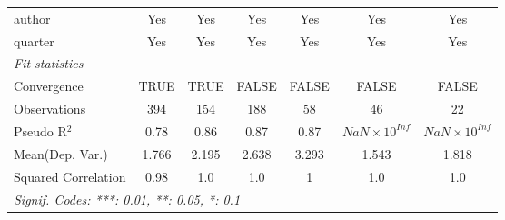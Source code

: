 \begin{tabular}{lcccccc}
   author                                                     & Yes         & Yes    & Yes          & Yes          & Yes                            & Yes\\  
   quarter                                                    & Yes         & Yes    & Yes          & Yes          & Yes                            & Yes\\  
   \midrule
   \emph{Fit statistics}\\
   Convergence                                                &TRUE         & TRUE   & FALSE        & FALSE        & FALSE                          & FALSE\\  
   Observations                                               & 394         & 154    & 188          & 58           & 46                             & 22\\  
   Pseudo R$^2$                                               & 0.78        & 0.86   & 0.87         & 0.87         & $NaN\times 10^{Inf}$           & $NaN\times 10^{Inf}$\\   
Mean(Dep. Var.) & 1.766 & 2.195 & 2.638 & 3.293 & 1.543 & 1.818 \\
   Squared Correlation                                        & 0.98        & 1.0    & 1.0          & 1            & 1.0                            & 1.0\\  
   \midrule \midrule
   \multicolumn{7}{l}{\emph{Signif. Codes: ***: 0.01, **: 0.05, *: 0.1}}\\
\end{tabular}
\par\endgroup
